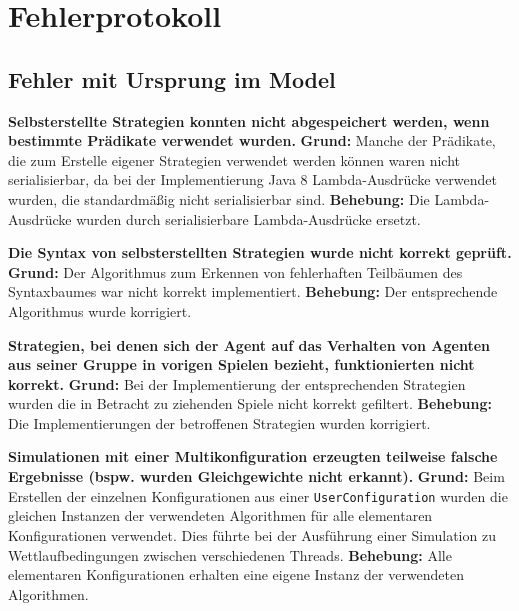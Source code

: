 \documentclass[parskip=full,11pt,openany]{scrreprt}
\begin{document}
\chapter{Fehlerprotokoll}

\section{Fehler mit Ursprung im Model}

\textbf{Selbsterstellte Strategien konnten nicht abgespeichert werden, wenn bestimmte Prädikate verwendet wurden.} 
\newline
\textbf{Grund: } Manche der Prädikate, die zum Erstelle eigener Strategien verwendet werden können waren nicht serialisierbar, da bei der Implementierung Java 8 Lambda-Ausdrücke verwendet wurden, die standardmäßig nicht serialisierbar sind.
\newline
\textbf{Behebung: } Die Lambda-Ausdrücke wurden durch serialisierbare Lambda-Ausdrücke ersetzt.

\textbf{Die Syntax von selbsterstellten Strategien wurde nicht korrekt geprüft.} \newline
\textbf{Grund: } Der Algorithmus zum Erkennen von fehlerhaften Teilbäumen des Syntaxbaumes war nicht korrekt implementiert.
\newline
\textbf{Behebung: } Der entsprechende Algorithmus wurde korrigiert.

\textbf{Strategien, bei denen sich der Agent auf das Verhalten von Agenten aus seiner Gruppe in vorigen Spielen bezieht, funktionierten nicht korrekt.} 
\newline
\textbf{Grund: } Bei der Implementierung der entsprechenden Strategien wurden die in Betracht zu ziehenden Spiele nicht korrekt gefiltert.
\newline
\textbf{Behebung: } Die Implementierungen der betroffenen Strategien wurden korrigiert.

\textbf{Simulationen mit einer Multikonfiguration erzeugten teilweise falsche Ergebnisse (bspw. wurden Gleichgewichte nicht erkannt).} 
\newline
\textbf{Grund: } Beim Erstellen der einzelnen Konfigurationen aus einer \texttt{UserConfiguration} wurden die gleichen Instanzen der verwendeten Algorithmen für alle elementaren Konfigurationen verwendet. Dies führte bei der Ausführung einer Simulation zu Wettlaufbedingungen zwischen verschiedenen Threads.
\newline
\textbf{Behebung: } Alle elementaren Konfigurationen erhalten eine eigene Instanz der verwendeten Algorithmen.
\end{document}
